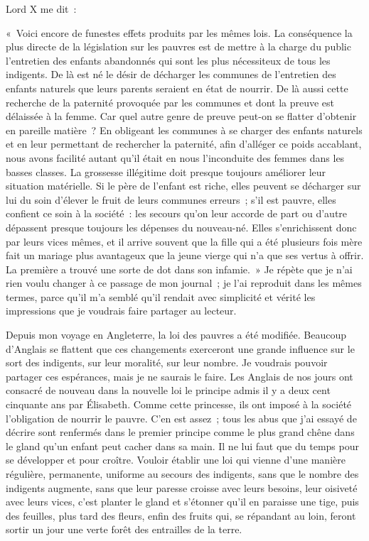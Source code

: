 \documentclass[twoside]{book} %
\newenvironment{quoteblock}
  {\begin{quoting}\setstretch{0.9}} %
  {\end{quoting}}
\newcommand{\quoteskip}{\medskip}
\newenvironment{quotebar}{%
    \def\FrameCommand{{\color{rubric!10!}\vrule width 0.5em} \hspace{0.9em}}%
    \def\OuterFrameSep{0pt} %
    \MakeFramed {\advance\hsize-\width \FrameRestore}
  }%
  {%
    \endMakeFramed
  }
\renewenvironment{quoteblock}%
  {%
    \savenotes
    \setstretch{0.9}
    \begin{quotebar}
    \smallskip
  }
  {%
    \smallskip
    \end{quotebar}
    \spewnotes
  }
\begin{document}
\noindent Lord X me dit :\par
\quoteskip\begin{quoteblock}
 \noindent « Voici encore de funestes effets produits par les mêmes lois. La conséquence la plus directe de la législation sur les pauvres est de mettre à la charge du public l’entretien des enfants abandonnés qui sont les plus nécessiteux de tous les indigents. De là est né le désir de décharger les communes de l’entretien des enfants naturels que leurs parents seraient en état de nourrir. De là aussi cette recherche de la paternité provoquée par les communes et dont la preuve est délaissée à la femme. Car quel autre genre de preuve peut-on se flatter d’obtenir en pareille matière ? En obligeant les communes à se charger des enfants naturels et en leur permettant de rechercher la paternité, afin d’alléger ce poids accablant, nous avons facilité autant qu’il était en nous l’inconduite des femmes dans les basses classes. La grossesse illégitime doit presque toujours améliorer leur situation matérielle. Si le père de l’enfant est riche, elles peuvent se décharger sur lui du soin d’élever le fruit de leurs communes erreurs ; s’il est pauvre, elles confient ce soin à la société : les secours qu’on leur accorde de part ou d’autre dépassent presque toujours les dépenses du nouveau-né. Elles s’enrichissent donc par leurs vices mêmes, et il arrive souvent que la fille qui a été plusieurs fois mère fait un mariage plus avantageux que la jeune vierge qui n’a que ses vertus à offrir. La première a trouvé une sorte de dot dans son infamie. »
 \end{quoteblock}\quoteskip
\noindent Je répète que je n’ai rien voulu changer à ce passage de mon journal ; je l’ai reproduit dans les mêmes termes, parce qu’il m’a semblé qu’il rendait avec simplicité et vérité les impressions que je voudrais faire partager au lecteur.\par
Depuis mon voyage en Angleterre, la loi des pauvres a été modifiée. Beaucoup d’Anglais se flattent que ces changements exerceront une grande influence sur le sort des indigents, sur leur moralité, sur leur nombre. Je voudrais pouvoir partager ces espérances, mais je ne saurais le faire. Les Anglais de nos jours ont consacré de nouveau dans la nouvelle loi le principe admis il y a deux cent cinquante ans par Élisabeth. Comme cette princesse, ils ont imposé à la société l’obligation de nourrir le pauvre. C'en est assez ; tous les abus que j’ai essayé de décrire sont renfermés dans le premier principe comme le plus grand chêne dans le gland qu’un enfant peut cacher dans sa main. Il ne lui faut que du temps pour se développer et pour croître. Vouloir établir une loi qui vienne d’une manière régulière, permanente, uniforme au secours des indigents, sans que le nombre des indigents augmente, sans que leur paresse croisse avec leurs besoins, leur oisiveté avec leurs vices, c’est planter le gland et s’étonner qu’il en paraisse une tige, puis des feuilles, plus tard des fleurs, enfin des fruits qui, se répandant au loin, feront sortir un jour une verte forêt des entrailles de la terre.\par
\end{document}
